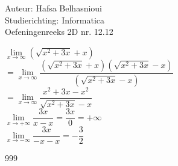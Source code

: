 \documentclass[a4paper]{article}
\begin{document}
\noindent \large Auteur: Hafsa Belhasnioui \\
\noindent \large Studierichting: Informatica\\
\noindent \large Oefeningenreeks 2D nr. 12.12\\

\medskip

\normalsize

$\lim\limits_{x \rightarrow \infty} (\sqrt{x^2 + 3x} + x)$ \\

$= \lim\limits_{x \rightarrow \infty} \dfrac{(\sqrt{x^2 + 3x} + x)(\sqrt{x^2 + 3x} - x)}{(\sqrt{x^2 + 3x} - x)}$ \\

$= \lim\limits_{x \rightarrow \infty} \dfrac{x^2 + 3x - x^2}{\sqrt{x^2 + 3x}-x}$ \\


$\lim\limits_{x \rightarrow +\infty} \dfrac{3x}{x-x} = \dfrac{3x}{0} = +\infty$ \\

$\lim\limits_{x \rightarrow -\infty} \dfrac{3x}{-x-x} = -\dfrac{3}{2}$ \\


\begin{thebibliography}{999}
\end{thebibliography}
\end{document}
